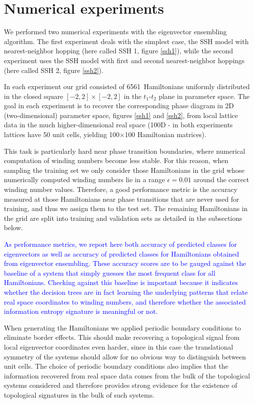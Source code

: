 \documentclass[10pt]{revtex4-1}
\newcommand\nHam{6561}  %
\newcommand\epsilonValue{0.01}  %
\newcommand{\citequote}[1]{\ref{#1}}
\begin{document}
\section{Numerical experiments}
\label{numerical_experiments}
We performed two numerical experiments with the eigenvector ensembling algorithm. The first experiment deals with the simplest case, the SSH model with nearest-neighbor hopping (here called SSH 1, figure \ref{ssh1}), while the second experiment uses the SSH model with first and second nearest-neighbor hoppings (here called SSH 2, figure \ref{ssh2}).

In each experiment our grid consisted of \nHam\ Hamiltonians uniformly distributed in the closed square $[-2,2]\times[-2,2]$ in the $t_1$-$t_2$ plane in parameter space. The goal in each experiment is to recover the corresponding phase diagram in 2D (two-dimensional) parameter space, figures \ref{ssh1} and \ref{ssh2}, from local lattice data in the much higher-dimensional real space (100D - in both experiments lattices have 50 unit cells, yielding 100$\times$100 Hamiltonian matrices).

This task is particularly hard near phase transition boundaries, where numerical computation of winding numbers become less stable. For this reason, when sampling the training set we only consider those Hamiltonians in the grid whose numerically computed winding numbers lie in a range $\epsilon = \epsilonValue$ around the correct winding number values. Therefore, a good performance metric is the accuracy measured at those Hamiltonians near phase transitions that are never used for training, and thus we assign them to the test set. The remaining Hamiltonians in the grid are split into training and validation sets as detailed in the subsections below.

\textcolor{blue}{As performance metrics, we report here both accuracy of predicted classes for eigenvectors as well as accuracy of predicted classes for Hamiltonians obtained from eigenvector ensembling. These accuracy scores are to be gauged against the baseline of a system that simply guesses the most frequent class for all Hamiltonians. Checking against this baseline is important because it indicates whether the decision trees are in fact learning the underlying patterns that relate real space coordinates to winding numbers, and therefore whether the associated information entropy signature is meaningful or not.}%

When generating the Hamiltonians we applied periodic boundary conditions to eliminate border effects. This should make recovering a topological signal from local eigenvector coordinates even harder, since in this case the translational symmetry of the systems should allow for no obvious way to distinguish between unit cells. The choice of periodic boundary conditions also implies that the information recovered from real space data comes from the bulk of the topological systems considered and therefore provides strong evidence for the existence of topological signatures in the bulk of such systems. 
\end{document}
